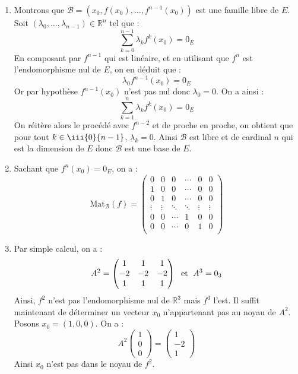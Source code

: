\documentclass[a4paper,twoside,french,11pt]{VcCours}
\begin{document}
\begin{enumerate}
\item Montrons que $\mathcal{B}= (x_0, f(x_0), \ldots, f^{n-1}(x_0))$ est une famille libre de $E$. Soit $(\lambda_0, \ldots, \lambda_{n-1}) \in \mathbb{R}^n$ tel que :
$$ \sum_{k=0}^{n-1} \lambda_k f^k (x_0) = 0_E$$
En composant par $f^{n-1}$ qui est linéaire, et en utilisant que $f^n$ est l'endomorphisme nul de $E$, on en déduit que :
$$ \lambda_0 f^{n-1}(x_0)=0_E$$
Or par hypothèse $f^{n-1}(x_0)$ n'est pas nul donc $\lambda_0=0$. On a ainsi :
$$ \sum_{k=1}^n \lambda_k f^k (x_0) = 0_E$$
On réitère alors le procédé avec $f^{n-2}$ et de proche en proche, on obtient que pour tout $k \in \iii{0}{n-1}$, $\lambda_k=0$. Ainsi $\mathcal{B}$ est libre et de cardinal $n$ qui est la dimension de $E$ donc $\mathcal{B}$ est une base de $E$.
\item Sachant que $f^n(x_0)=0_E$, on a :
$$ \textrm{Mat}_{\mathcal{B}}(f) = \begin{pmatrix}
0 & 0 & 0 & \cdots & 0 & 0 \\
1 & 0 & 0 & \cdots & 0 & 0 \\
0 & 1 & 0 & \cdots & 0& 0 \\
\vdots & \vdots& \ddots    & \ddots &  \vdots & \vdots \\
0 & 0 & \cdots & 1 &0 & 0\\
0 & 0 & \cdots & 0 & 1 & 0 \\
\end{pmatrix}$$

\item Par simple calcul, on a :
$$ A^2  = \begin{pmatrix}
1 & 1 & 1 \\
-2 & -2& -2 \\
1 & 1 & 1 
\end{pmatrix} \; \hbox{ et } \; A^3 = 0_3$$
Ainsi, $f^2$ n'est pas l'endomorphisme nul de $\mathbb{R}^3$ mais $f^3$ l'est. Il suffit maintenant de déterminer un vecteur $x_0$ n'appartenant pas au noyau de $A^2$. Posons $x_0= (1,0,0)$. On a :
$$ A^2 \begin{pmatrix}
1 \\
0\\
0
\end{pmatrix} = \begin{pmatrix}
1 \\
-2 \\
1
\end{pmatrix}$$
Ainsi $x_0$ n'est pas dans le noyau de $f^2$.
\end{enumerate}
\end{document}
